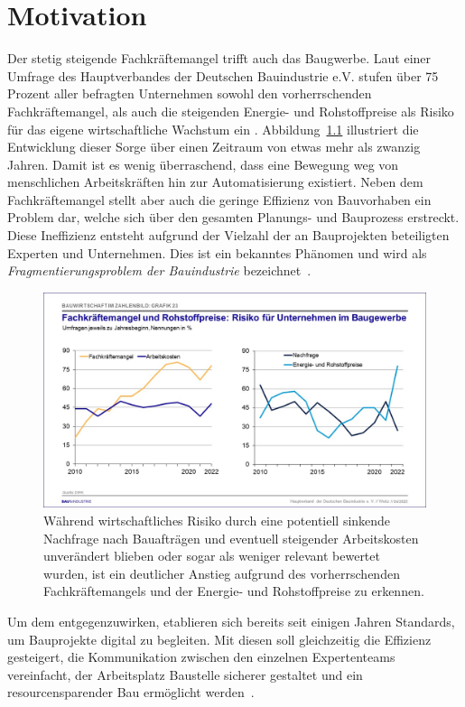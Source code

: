 \chapter{Motivation}\label{motivation}
Der stetig steigende Fachkräftemangel trifft auch das Baugwerbe. 
Laut einer Umfrage des Hauptverbandes der Deutschen Bauindustrie e.V. stufen über 75 Prozent aller befragten Unternehmen sowohl den vorherrschenden Fachkräftemangel, als auch die steigenden Energie- und Rohstoffpreise als Risiko für das eigene wirtschaftliche Wachstum ein \cite{Bauindustrie:online}.
Abbildung~\ref{fig:Fachkraeftemangel} illustriert die Entwicklung dieser Sorge über einen Zeitraum von etwas mehr als zwanzig Jahren.
Damit ist es wenig überraschend, dass eine Bewegung weg von menschlichen Arbeitskräften hin zur Automatisierung existiert.
Neben dem Fachkräftemangel stellt aber auch die geringe Effizienz von Bauvorhaben ein Problem dar, welche sich über den gesamten Planungs- und Bauprozess erstreckt. 
Diese Ineffizienz entsteht aufgrund der Vielzahl der an Bauprojekten beteiligten Experten und Unternehmen.
Dies ist ein bekanntes Phänomen und wird als \textit{Fragmentierungsproblem der Bauindustrie} bezeichnet~\cite{ConstructionFragmentation}.
\begin{figure}[h]
    \centering
    \includegraphics[width=0.7\columnwidth]{fig/Grafik_23.jpg}
    \caption{Während wirtschaftliches Risiko durch eine potentiell sinkende Nachfrage nach Bauafträgen und eventuell steigender Arbeitskosten unverändert blieben oder sogar als weniger relevant bewertet wurden, ist ein deutlicher Anstieg aufgrund des vorherrschenden Fachkräftemangels und der Energie- und Rohstoffpreise zu erkennen.}
    \label{fig:Fachkraeftemangel}
\end{figure}
Um dem entgegenzuwirken, etablieren sich bereits seit einigen Jahren Standards, um Bauprojekte digital zu begleiten.
Mit diesen soll gleichzeitig die Effizienz gesteigert, die Kommunikation zwischen den einzelnen Expertenteams vereinfacht, der Arbeitsplatz \glqq{}Baustelle\grqq{} sicherer gestaltet und ein resourcensparender Bau ermöglicht werden~\cite{BIMforHe12:online}\cite{Top10Ben31:online}.

